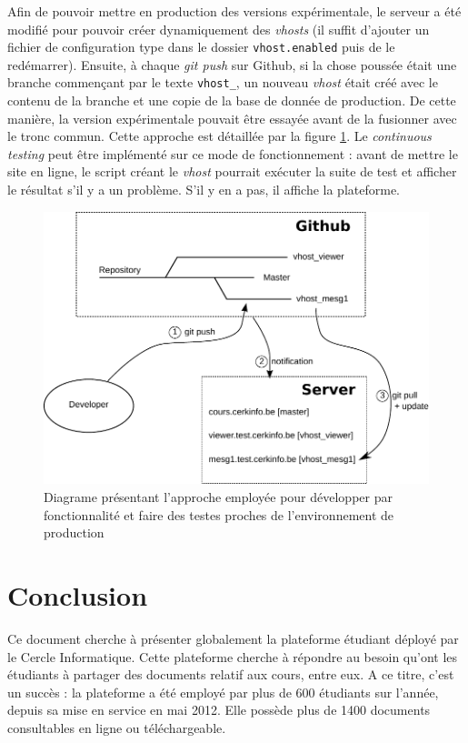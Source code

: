 \documentclass[a4paper,12pt]{article}
\begin{document}
Afin de pouvoir mettre en production des versions expérimentale, le serveur a été
modifié pour pouvoir créer dynamiquement des \textit{vhosts} (il suffit d'ajouter un
fichier de configuration type dans le dossier \texttt{vhost.enabled} puis de le redémarrer).
Ensuite, à chaque \textit{git push} sur Github, si la chose poussée était une
branche commençant par le texte \texttt{vhost\_}, un nouveau \textit{vhost} était créé avec
le contenu de la branche et une copie de la base de donnée de production.
De cette manière, la version expérimentale pouvait être essayée avant de la
fusionner avec le tronc commun. Cette approche est détaillée par la figure \ref{fig:git}.
Le \textit{continuous testing} peut être implémenté sur ce mode de fonctionnement : avant
de mettre le site en ligne, le script créant le \textit{vhost} pourrait exécuter la suite
de test et afficher le résultat s'il y a un problème. S'il y en a pas, il affiche
la plateforme.

\begin{figure}
  \centering\includegraphics[scale=0.9]{imgs/git.pdf}
  \caption{Diagrame présentant l'approche employée pour développer par fonctionnalité
           et faire des testes proches de l'environnement de production}
  \label{fig:git}
\end{figure}


\section{Conclusion}

Ce document cherche à présenter globalement la plateforme étudiant déployé par le
Cercle Informatique. Cette plateforme cherche à répondre au besoin qu'ont les étudiants
à partager des documents relatif aux cours, entre eux. A ce titre, c'est un succès :
la plateforme a été employé par plus de 600 étudiants sur l'année, depuis sa mise en
service en mai 2012. Elle possède plus de 1400 documents consultables en ligne ou
téléchargeable.
\end{document}
